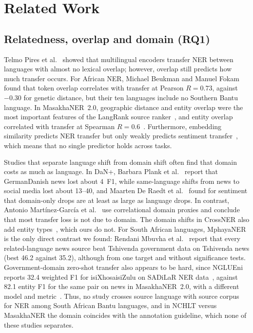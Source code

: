 \section{Related Work}\label{sec:related}

\subsection{Relatedness, overlap and domain (RQ1)}\label{sec:rw-rq1}
Telmo Pires et al.~\cite{pires2019} showed that multilingual encoders transfer NER between languages with almost no lexical overlap; however, overlap still predicts how much transfer occurs. For African NER, Michael Beukman and Manuel Fokam~\cite{beukman2023} found that token overlap correlates with transfer at Pearson $R=0.73$, against $-0.30$ for genetic distance, but their ten languages include no Southern Bantu language. In MasakhaNER~2.0, geographic distance and entity overlap were the most important features of the LangRank source ranker~\cite{lin2019}, and entity overlap correlated with transfer at Spearman $R=0.6$~\cite{adelani2022}. Furthermore, embedding similarity predicts NER transfer but only weakly predicts sentiment transfer~\cite{idris2026}, which means that no single predictor holds across tasks.

Studies that separate language shift from domain shift often find that domain costs as much as language. In DaN+, Barbara Plank et al.~\cite{plank2020} report that German\ra Danish news lost about 4~F1, while same-language shifts from news to social media lost about 13--40, and Maarten De Raedt et al.~\cite{deraedt2023} found for sentiment that domain-only drops are at least as large as language drops. In contrast, Antonio Martínez-García et al.~\cite{martinezgarcia2021} use correlational domain proxies and conclude that most transfer loss is not due to domain. The domain shifts in CrossNER also add entity types~\cite{liu2021crossner}, which ours do not. For South African languages, MphayaNER is the only direct contrast we found: Rendani Mbuvha et al.~\cite{mbuvha2023} report that every related-language news source beat Tshivenda government data on Tshivenda news (best 46.2 against 35.2), although from one target and without significance tests. Government-domain zero-shot transfer also appears to be hard, since NGLUEni reports 32.4 weighted F1 for isiXhosa\ra isiZulu on SADiLaR NER data~\cite{meyer2024}, against 82.1 entity F1 for the same pair on news in MasakhaNER~2.0, with a different model and metric~\cite{adelani2022}. Thus, no study crosses source language with source corpus for NER among South African Bantu languages, and in NCHLT versus MasakhaNER the domain coincides with the annotation guideline, which none of these studies separates.

